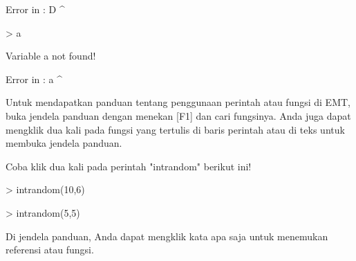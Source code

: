 \documentclass{report}
\begin{document}
\begin{eulernotebook}
\begin{eulercomment}
\begin{eulercomment}
\begin{euleroutput}
  Error in :
   D
    ^
\end{euleroutput}
\begin{eulerprompt}
> a
\end{eulerprompt}
\begin{euleroutput}
  Variable a not found!
  
  Error in :
   a
    ^
\end{euleroutput}
\begin{eulercomment}
Untuk mendapatkan panduan tentang penggunaan perintah atau fungsi di
EMT, buka jendela panduan dengan menekan [F1] dan cari fungsinya. Anda
juga dapat mengklik dua kali pada fungsi yang tertulis di baris
perintah atau di teks untuk membuka jendela panduan.

Coba klik dua kali pada perintah "intrandom" berikut ini!
\end{eulercomment}
\begin{eulerprompt}
> intrandom(10,6)
\end{eulerprompt}
\begin{euleroutput}
  [4,  2,  6,  2,  4,  2,  3,  2,  2,  6]
\end{euleroutput}
\begin{eulerprompt}
> intrandom(5,5)
\end{eulerprompt}
\begin{euleroutput}
  [3,  3,  1,  2,  5]
\end{euleroutput}
\begin{eulercomment}
Di jendela panduan, Anda dapat mengklik kata apa saja untuk menemukan
referensi atau fungsi.


\end{eulercomment}
\end{eulercomment}
\end{eulercomment}
\end{eulernotebook}
\end{document}
